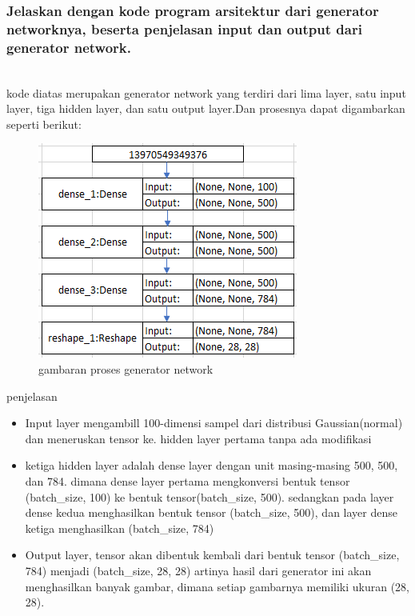 \subsubsection{Jelaskan dengan kode program arsitektur dari generator networknya, beserta penjelasan input dan output dari generator network.}
\hfill\\

kode diatas merupakan generator network yang terdiri dari lima layer, satu input layer, tiga hidden layer, dan satu output layer.Dan prosesnya dapat digambarkan seperti berikut:
\begin{figure}[H]
	\centering
	\includegraphics[scale=0.5]{figures/1174083/figures8/3a.png}
	\caption{gambaran proses generator network}
\end{figure}
penjelasan
\begin{itemize}
	\item Input layer mengambill 100-dimensi sampel dari distribusi Gaussian(normal) dan meneruskan tensor ke. hidden layer pertama tanpa ada modifikasi
	\item ketiga hidden layer adalah dense layer dengan unit masing-masing 500, 500, dan 784. dimana dense layer pertama mengkonversi bentuk tensor (batch\_size, 100) ke bentuk tensor(batch\_size, 500). sedangkan pada layer dense kedua menghasilkan bentuk tensor (batch\_size, 500), dan layer dense ketiga menghasilkan (batch\_size, 784)
	\item Output layer, tensor akan dibentuk kembali dari bentuk tensor (batch\_size, 784) menjadi (batch\_size, 28, 28) artinya hasil dari generator ini akan menghasilkan banyak gambar, dimana setiap gambarnya memiliki ukuran (28, 28). 
\end{itemize}

